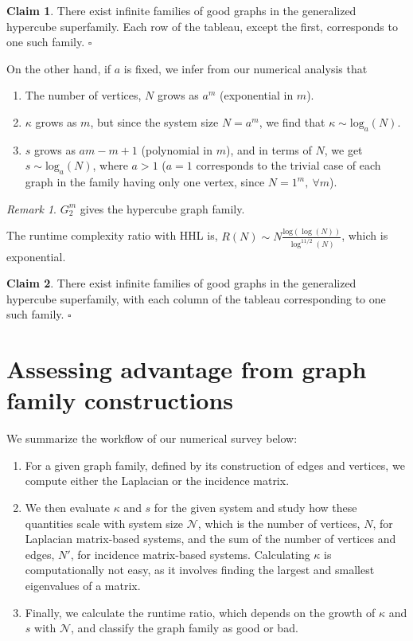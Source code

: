 \documentclass[%
 reprint,
 superscriptaddress,
 amsmath,amssymb,
 aps,
 pra,
floatfix,
nofootinbib,
]{revtex4-2}
\theoremstyle{definition}
\newtheorem{claim}{Claim}
\theoremstyle{remark}
\newtheorem*{remark}{Remark}
\begin{document}
\begin{claim}
There exist infinite families of good graphs in the generalized hypercube superfamily. Each row of the tableau, except the first, corresponds to one such family. \hfill $\square$ 
\end{claim}

On the other hand, if $a$ is fixed, we infer from our numerical analysis that 

\begin{enumerate}
\item The number of vertices, $N$ grows as $a^m$ (exponential in $m$). 
\item $\kappa$ grows as $m$, but since the system size $N = a^m$, we find that $\kappa \sim \mathrm{log}_a(N)$. 
\item $s$ grows as $am-m+1$ (polynomial in $m$), and in terms of $N$, we get $s \sim \mathrm{log}_a(N)$, where $a > 1$ ($a=1$ corresponds to the trivial case of each graph in the family having only one vertex, since $N = 1^m,\ \forall m$). 
\end{enumerate} 

\begin{remark} \label{rem:ghcg2}
$G_2^m$ gives the hypercube graph family. 
\end{remark} 

The runtime complexity ratio with HHL is, $R(N) \sim N\frac{\mathrm{log}(\log(N))}{\log^{11/2}(N)} $, which is exponential.

\begin{claim}
There exist infinite families of good graphs in the generalized hypercube superfamily, with each column of the tableau corresponding to one such family. \hfill $\square$ 
\end{claim} 

\section{Assessing advantage from graph family constructions} \label{sec:lessons} 

We summarize the workflow of our numerical survey below:

\begin{enumerate}
\item For a given graph family, defined by its construction of edges and vertices, we compute either the Laplacian or the incidence matrix.
\item We then evaluate $\kappa$ and $s$ for the given system and study how these quantities scale with system size $\mathcal{N}$, which is the number of vertices, $N$, for Laplacian matrix-based systems, and the sum of the number of vertices and edges, $N'$, for incidence matrix-based systems. Calculating $\kappa$ is computationally not easy, as it involves finding the largest and smallest eigenvalues of a matrix. 
\item Finally, we calculate the runtime ratio, which depends on the growth of $\kappa$ and $s$ with $\mathcal{N}$, and classify the graph family as good or bad. 
\end{enumerate} 
\end{document}
